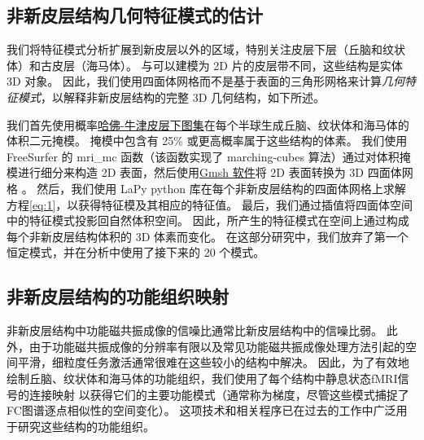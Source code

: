\documentclass[lang=cn,a4paper,newtx,citestyle=gb7714-2015, bibstyle=gb7714-2015]{elegantpaper}
\begin{document}
\subsection{非新皮层结构几何特征模式的估计} \label{sec:geometric_estimation}

我们将特征模式分析扩展到新皮层以外的区域，特别关注皮层下层（丘脑和纹状体）和古皮层（海马体）。
与可以建模为 2D 片的皮层带不同，这些结构是实体 3D 对象。 
因此，我们使用四面体网格而不是基于表面的三角形网格来计算\textit{几何特征模式}，以解释非新皮层结构的完整 3D 几何结构\cite{wachinger2015brainprint}，如下所述。


我们首先使用概率\href{https://fsl.fmrib.ox.ac.uk/fsl/fslwiki/Atlases}{哈佛-牛津皮层下图集}在每个半球生成丘脑、纹状体和海马体的体积二元掩模。
掩模中包含有 25\% 或更高概率属于这些结构的体素。
我们使用 FreeSurfer 的 mri\_mc 函数（该函数实现了 marching-cubes 算法）通过对体积掩模进行细分来构造 2D 表面，然后使用\href{https://gmsh.info/}{Gmsh 软件}将 2D 表面转换为 3D 四面体网格 。
然后，我们使用 LaPy python 库在每个非新皮层结构的四面体网格上求解方程\ref{eq:1}，以获得特征模及其相应的特征值。
最后，我们通过插值将四面体空间中的特征模式投影回自然体积空间。
因此，所产生的特征模式在空间上通过构成每个非新皮层结构体积的 3D 体素而变化。
在这部分研究中，我们放弃了第一个恒定模式，并在分析中使用了接下来的 20 个模式。


\subsection{非新皮层结构的功能组织映射} \label{sec:functional_mapping}

非新皮层结构中功能磁共振成像的信噪比通常比新皮层结构中的信噪比弱\cite{uugurbil2013pushing}。
此外，由于功能磁共振成像的分辨率有限以及常见功能磁共振成像处理方法引起的空间平滑，细粒度任务激活通常很难在这些较小的结构中解决。
因此，为了有效地绘制丘脑、纹状体和海马体的功能组织，我们使用了每个结构中静息状态fMRI信号的连接映射\cite{haak2018connectopic} 以获得它们的主要功能模式（通常称为梯度，尽管这些模式捕捉了FC图谱逐点相似性的空间变化）。
这项技术和相关程序已在过去的工作中广泛用于研究这些结构的功能组织\cite{vos2018anatomical,yang2020thalamic,oldehinkel2022mapping}。
\end{document}

